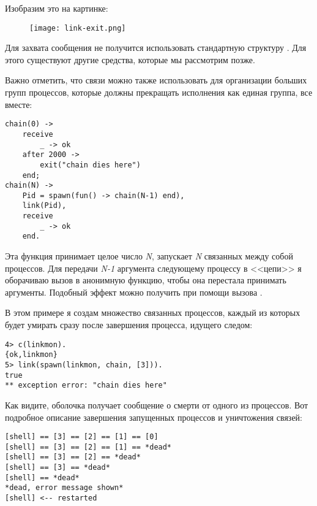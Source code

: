Изобразим это на картинке:
\begin{figure}[h!]
    \centering
    \texttt{[image: link-exit.png]}
\end{figure}

Для захвата сообщения  не получится использовать стандартную структуру .
Для этого существуют другие средства, которые мы рассмотрим позже.

Важно отметить, что связи можно также использовать для организации больших групп процессов, которые должны прекращать исполнения как единая группа, все вместе:
\begin{lstlisting}[style=erlang]
chain(0) ->
    receive
        _ -> ok
    after 2000 ->
        exit("chain dies here")
    end;
chain(N) ->
    Pid = spawn(fun() -> chain(N-1) end),
    link(Pid),
    receive
        _ -> ok
    end.
\end{lstlisting}

Эта функция принимает целое число \emph{N}, запускает \emph{N} связанных между собой процессов.
Для передачи \emph{N-1} аргумента следующему процессу в <<цепи>> я оборачиваю вызов в анонимную функцию, чтобы она перестала принимать аргументы.
Подобный эффект можно получить при помощи вызова .

В этом примере я создам множество связанных процессов, каждый из которых будет умирать сразу после завершения процесса, идущего следом:
\begin{lstlisting}[style=erlang]
4> c(linkmon).              
{ok,linkmon}
5> link(spawn(linkmon, chain, [3])).
true
** exception error: "chain dies here"
\end{lstlisting}

Как видите, оболочка получает сообщение о смерти от одного из процессов.
Вот подробное описание завершения запущенных процессов и уничтожения связей:
\begin{lstlisting}[style=erlang]
[shell] == [3] == [2] == [1] == [0]
[shell] == [3] == [2] == [1] == *dead*
[shell] == [3] == [2] == *dead*
[shell] == [3] == *dead*
[shell] == *dead*
*dead, error message shown*
[shell] <-- restarted
\end{lstlisting}


